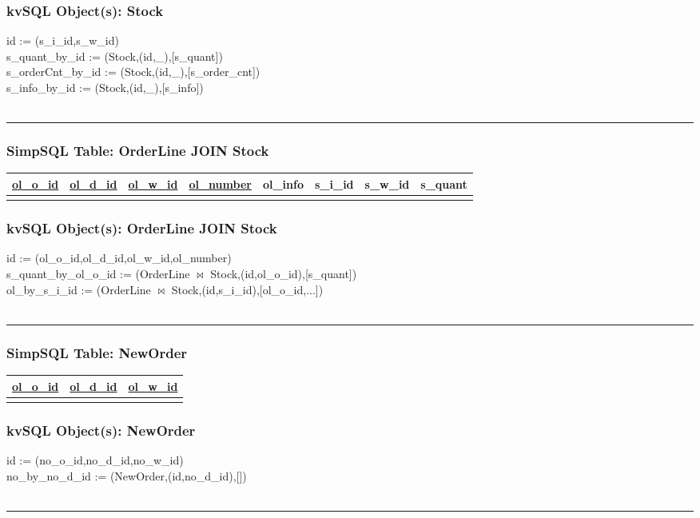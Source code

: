 \documentclass[12pt,letter]{article}
\begin{document}
\subsubsection*{kvSQL Object(s): Stock}  
id := (s\_i\_id,s\_w\_id) \\
s\_quant\_by\_id :=
(Stock,(id,\_),[s\_quant]) \\
s\_orderCnt\_by\_id :=
(Stock,(id,\_),[s\_order\_cnt]) \\
s\_info\_by\_id :=
(Stock,(id,\_),[s\_info]) \\
\\ 
\hrule


\subsubsection*{SimpSQL Table: OrderLine JOIN Stock}
\begin{tabular}{ |c|c|c|c|c|c|c|c| }
 \hline
 \underline{ol\_o\_id} & \underline{ol\_d\_id} & \underline{ol\_w\_id} &
 \underline{ol\_number} & ol\_info &s\_i\_id & s\_w\_id & s\_quant \\
 \hline
 &   &   & & & & &\\
 \hline
\end{tabular}

\subsubsection*{kvSQL Object(s): OrderLine JOIN Stock}  
id := (ol\_o\_id,ol\_d\_id,ol\_w\_id,ol\_number) \\
s\_quant\_by\_ol\_o\_id :=
(OrderLine $\bowtie$ Stock,(id,ol\_o\_id),[s\_quant]) \\
ol\_by\_s\_i\_id :=
(OrderLine $\bowtie$ Stock,(id,s\_i\_id),[ol\_o\_id,...]) \\
\\ 
\hrule


\subsubsection*{SimpSQL Table: NewOrder}
\begin{tabular}{ |c|c|c| }
 \hline
 \underline{ol\_o\_id} & \underline{ol\_d\_id} & \underline{ol\_w\_id}\\
 \hline
 &   &  \\
 \hline
\end{tabular}

\subsubsection*{kvSQL Object(s): NewOrder}  
id := (no\_o\_id,no\_d\_id,no\_w\_id) \\
no\_by\_no\_d\_id :=
(NewOrder,(id,no\_d\_id),[]) \\
\\ 
\hrule
\end{document}
